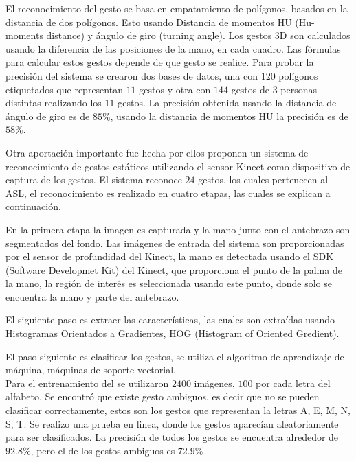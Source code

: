 El reconocimiento del gesto se basa en empatamiento de polígonos, basados en la distancia de dos polígonos. Esto usando Distancia de momentos HU (Hu-moments distance) y ángulo de giro (turning angle). 
Los gestos 3D son calculados usando la diferencia de las posiciones de la mano, en cada cuadro. Las fórmulas para calcular estos gestos depende de que gesto se  realice.  
Para probar la precisión del sistema se crearon dos bases de datos, una con $120$ polígonos etiquetados que representan $11$ gestos y otra con $144$ gestos de $3$ personas distintas realizando los $11$ gestos. La precisión obtenida usando la distancia de ángulo de giro es de $85 \%$, usando la distancia de momentos HU la precisión es de $58 \%$.  


Otra aportación importante fue hecha por \citep{Kang2013} ellos proponen un sistema de reconocimiento de  gestos estáticos utilizando el sensor Kinect como dispositivo de captura de los gestos. El sistema reconoce $24$ gestos, los cuales pertenecen al ASL, el reconocimiento es realizado en cuatro etapas, las cuales se explican a continuación.  

En la primera etapa la imagen es capturada y la mano junto con el antebrazo son segmentados del fondo. Las imágenes de entrada del sistema son proporcionadas por el sensor de profundidad del Kinect, la mano es detectada usando el SDK (Software Developmet Kit) del Kinect, que proporciona el punto de la palma de la mano, la región de interés es seleccionada usando este punto, donde  solo se encuentra la mano y parte del antebrazo.   

El siguiente paso es extraer las características, las cuales son extraídas usando Histogramas Orientados a Gradientes, HOG (Histogram of Oriented Gredient).  

El paso siguiente es clasificar los gestos, se utiliza el algoritmo de aprendizaje de máquina, máquinas de soporte vectorial.\\
Para el entrenamiento del se utilizaron $2400$ imágenes, $100$ por cada letra del alfabeto. Se encontró que existe gesto ambiguos, es decir que no se pueden clasificar correctamente, estos son los gestos que representan la letras A, E, M, N, S, T. 
Se realizo una prueba en linea, donde los gestos aparecían aleatoriamente para ser clasificados. La precisión de todos los gestos se encuentra alrededor de $92.8 \%$, pero el de los gestos ambiguos es $72.9 \%$

